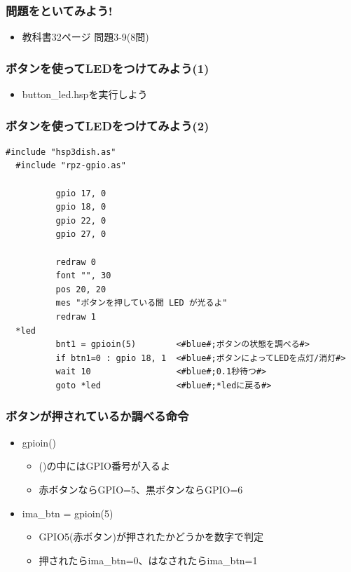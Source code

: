 \begin{frame}
  \frametitle{問題をといてみよう!}
  \begin{itemize}
    \item 教科書32ページ 問題3-9(8問)
  \end{itemize}
\end{frame}

\begin{frame}
  \frametitle{ボタンを使ってLEDをつけてみよう(1)}
  \begin{itemize}
    \item button\_led.hspを実行しよう
  \end{itemize}
\end{frame}

\begin{frame}[fragile]
  \frametitle{ボタンを使ってLEDをつけてみよう(2)}
  \begin{lstlisting}[title=button\_led.hsp, label=button_led.hsp]
  #include "hsp3dish.as"
  #include "rpz-gpio.as"
  
          gpio 17, 0
          gpio 18, 0
          gpio 22, 0
          gpio 27, 0

          redraw 0
          font "", 30
          pos 20, 20
          mes "ボタンを押している間 LED が光るよ"
          redraw 1
  *led
          bnt1 = gpioin(5)        <#blue#;ボタンの状態を調べる#>
          if btn1=0 : gpio 18, 1  <#blue#;ボタンによってLEDを点灯/消灯#>
          wait 10                 <#blue#;0.1秒待つ#>
          goto *led               <#blue#;*ledに戻る#>
  \end{lstlisting}
\end{frame}

\begin{frame}
  \frametitle{ボタンが押されているか調べる命令}
  \begin{itemize}
    \item gpioin()
          \begin{itemize}
            \item ()の中にはGPIO番号が入るよ
            \item 赤ボタンならGPIO=5、黒ボタンならGPIO=6
          \end{itemize}
    \item ima\_btn = gpioin(5)
          \begin{itemize}
            \item GPIO5(赤ボタン)が押されたかどうかを数字で判定
            \item 押されたらima\_btn=0、はなされたらima\_btn=1
          \end{itemize}
  \end{itemize}
\end{frame}

